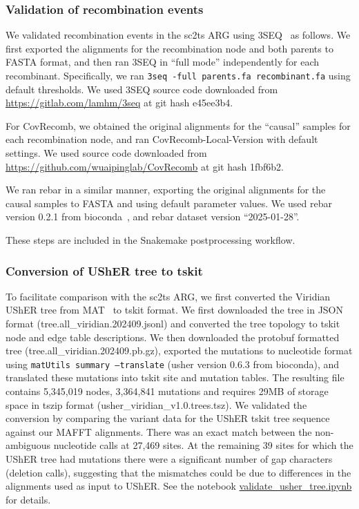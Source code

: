 \documentclass[12pt]{article}
\begin{document}
\subsubsection*{Validation of recombination events}

We validated recombination events in the sc2ts ARG
using 3SEQ~\cite{Lam2018improved} as follows.
We first exported the alignments for the recombination node and both
parents to FASTA format, and then ran 3SEQ in ``full mode''
independently for each recombinant. Specifically, we
ran \texttt{3seq -full parents.fa recombinant.fa}
using default thresholds.
We used 3SEQ source code downloaded from \url{https://gitlab.com/lamhm/3seq}
at git hash e45ee3b4.

For CovRecomb\cite{Zhou2023virusrecom}, we obtained the original alignments
for the ``causal'' samples for each recombination node, and ran
CovRecomb-Local-Version with default settings. We used source code
downloaded from \url{https://github.com/wuaipinglab/CovRecomb} at
git hash 1fbf6b2.

We ran rebar in a similar manner, exporting the original alignments for the
causal samples to FASTA and using default parameter values. We used
rebar version 0.2.1 from bioconda~\cite{Gruning2018bioconda}, and
rebar dataset version ``2025-01-28''.

These steps are included in the Snakemake postprocessing
workflow. %

\subsubsection*{Conversion of UShER tree to tskit}
To facilitate comparison with the sc2ts ARG, we first converted the Viridian
UShER tree from MAT~\cite{McBroome2021} to tskit format.
We first downloaded the tree in JSON format (tree.all\_viridian.202409.jsonl)
and converted the tree topology to tskit node and edge table
descriptions. We then downloaded the protobuf formatted
tree (tree.all\_viridian.202409.pb.gz), exported the mutations to
nucleotide format using \texttt{matUtils summary --translate}
(usher version 0.6.3 from bioconda), and translated
these mutations into tskit site and mutation tables.
The resulting file
 contains 5,345,019 nodes, 3,364,841
mutations and requires 29MB of storage space in tszip format (usher\_viridian\_v1.0.trees.tsz).
We validated the conversion by comparing the
variant data for the UShER tskit tree sequence against our MAFFT alignments.
There was an exact match between the non-ambiguous nucleotide calls
at 27,469 sites.
At the remaining 39 sites for which the UShER tree
had mutations there were a significant
number of gap characters (deletion calls), suggesting that the mismatches
could be due to differences in the alignments used as input to UShER.
See the notebook
\href{https://github.com/jeromekelleher/sc2ts-paper/blob/main/notebooks/validate\_usher\_tree.ipynb}{validate\_usher\_tree.ipynb}
for details.
\end{document}
